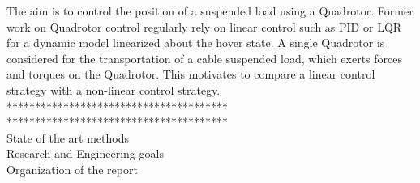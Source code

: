     				The aim is to control the position of a suspended load using a Quadrotor. Former work on Quadrotor control regularly rely on linear control such as PID or LQR for a dynamic model linearized about the hover state. A single Quadrotor is considered for the transportation of a cable suspended load, which exerts forces and torques on the Quadrotor. 
%    				    				
    				This motivates to compare a linear control strategy with a non-linear control strategy. 
%    
    ***************************************\\


            ***************************************\\

State of the art methods\\
Research and Engineering goals\\
Organization of the report

